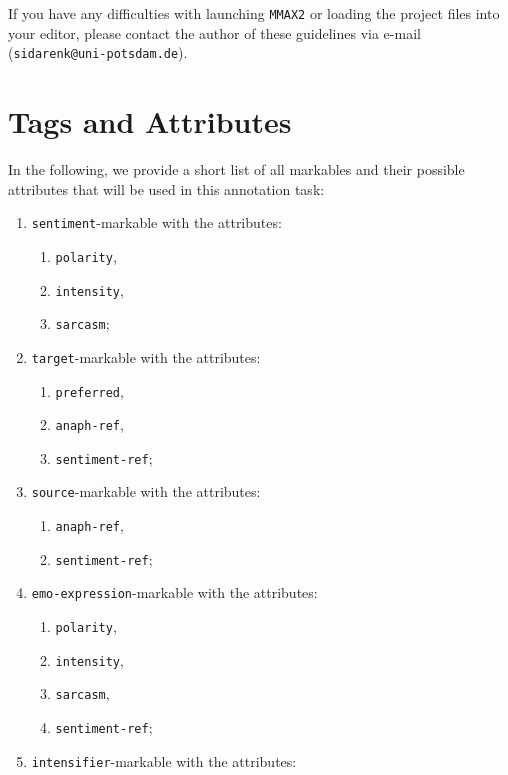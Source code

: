 \documentclass[11pt,a4paper]{article}
\makeatletter
\newcommand{\authorAddress}{\texttt{sidarenk@uni-potsdam.de}}
\theoremstyle{mytheoremstyle}
\makeatother
\begin{document}
If you have any difficulties with launching \texttt{MMAX2} or loading
the project files into your editor, please contact the author of these
guidelines via e-mail (\authorAddress{}).


\section{Tags and Attributes}\label{sec:markables}
In the following, we provide a short list of all markables and their
possible attributes that will be used in this annotation task:

\begin{multicols}{2}
  \begin{enumerate}
  \item \texttt{sentiment}-markable with the attributes:
    \begin{enumerate}
    \item \texttt{polarity},
    \item \texttt{intensity},
    \item \texttt{sarcasm};
    \end{enumerate}
  \item \texttt{target}-markable with the attributes:
    \begin{enumerate}
    \item \texttt{preferred},
    \item \texttt{anaph-ref},
    \item \texttt{sentiment-ref};
    \end{enumerate}
  \item \texttt{source}-markable with the attributes:
    \begin{enumerate}
    \item \texttt{anaph-ref},
    \item \texttt{sentiment-ref};
    \end{enumerate}
  \item \texttt{emo-expression}-markable with the attributes:
    \begin{enumerate}
    \item \texttt{polarity},
    \item \texttt{intensity},
    \item \texttt{sarcasm},
    \item \texttt{sentiment-ref};
    \end{enumerate}
  \item \texttt{intensifier}-markable with the attributes:

\end{enumerate}
\end{multicols}
\end{document}
